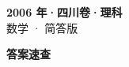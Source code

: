\documentclass[zihao=-4, a4paper]{ctexart}
\begin{document}
\begin{center}
  {\Large\bfseries 2006 年·四川卷·理科}\\[4pt]
  {\large 数学 · 简答版}
\end{center}
\medskip
{}

\clearpage
{}
\begin{center}{\Large\bfseries 答案速查}\end{center}
\medskip

\end{document}
